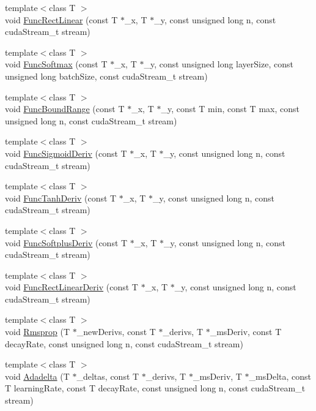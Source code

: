 \begin{DoxyCompactItemize}
{\footnotesize template$<$class T $>$ }\\void \hyperlink{namespacefractal_1_1cudaKernels_a1214ead9e6a1af20689767f797e21ad7}{Func\+Rect\+Linear} (const T $\ast$\+\_\+x, T $\ast$\+\_\+y, const unsigned long n, const cuda\+Stream\+\_\+t stream)
\item 
{\footnotesize template$<$class T $>$ }\\void \hyperlink{namespacefractal_1_1cudaKernels_a715361cdca467605d0e1f1c617b3ab24}{Func\+Softmax} (const T $\ast$\+\_\+x, T $\ast$\+\_\+y, const unsigned long layer\+Size, const unsigned long batch\+Size, const cuda\+Stream\+\_\+t stream)
\item 
{\footnotesize template$<$class T $>$ }\\void \hyperlink{namespacefractal_1_1cudaKernels_a6feb31a8214d6d93c06164645f3f67ae}{Func\+Bound\+Range} (const T $\ast$\+\_\+x, T $\ast$\+\_\+y, const T min, const T max, const unsigned long n, const cuda\+Stream\+\_\+t stream)
\item 
{\footnotesize template$<$class T $>$ }\\void \hyperlink{namespacefractal_1_1cudaKernels_a694c2d619f8a1707e7ed0c74e9e5e952}{Func\+Sigmoid\+Deriv} (const T $\ast$\+\_\+x, T $\ast$\+\_\+y, const unsigned long n, const cuda\+Stream\+\_\+t stream)
\item 
{\footnotesize template$<$class T $>$ }\\void \hyperlink{namespacefractal_1_1cudaKernels_a68955cd20f3f388efca2144a0ed07925}{Func\+Tanh\+Deriv} (const T $\ast$\+\_\+x, T $\ast$\+\_\+y, const unsigned long n, const cuda\+Stream\+\_\+t stream)
\item 
{\footnotesize template$<$class T $>$ }\\void \hyperlink{namespacefractal_1_1cudaKernels_aba4be7ae2ab58b610d51df2fa9e7af73}{Func\+Softplus\+Deriv} (const T $\ast$\+\_\+x, T $\ast$\+\_\+y, const unsigned long n, const cuda\+Stream\+\_\+t stream)
\item 
{\footnotesize template$<$class T $>$ }\\void \hyperlink{namespacefractal_1_1cudaKernels_ae718cea5137940efd2fc610705cb06b2}{Func\+Rect\+Linear\+Deriv} (const T $\ast$\+\_\+x, T $\ast$\+\_\+y, const unsigned long n, const cuda\+Stream\+\_\+t stream)
\item 
{\footnotesize template$<$class T $>$ }\\void \hyperlink{namespacefractal_1_1cudaKernels_a596801702086d94d5078d612296a2207}{Rmsprop} (T $\ast$\+\_\+new\+Derivs, const T $\ast$\+\_\+derivs, T $\ast$\+\_\+ms\+Deriv, const T decay\+Rate, const unsigned long n, const cuda\+Stream\+\_\+t stream)
\item 
{\footnotesize template$<$class T $>$ }\\void \hyperlink{namespacefractal_1_1cudaKernels_a6ae4a4a96a55184eca0a59025292b6eb}{Adadelta} (T $\ast$\+\_\+deltas, const T $\ast$\+\_\+derivs, T $\ast$\+\_\+ms\+Deriv, T $\ast$\+\_\+ms\+Delta, const T learning\+Rate, const T decay\+Rate, const unsigned long n, const cuda\+Stream\+\_\+t stream)
\end{DoxyCompactItemize}


